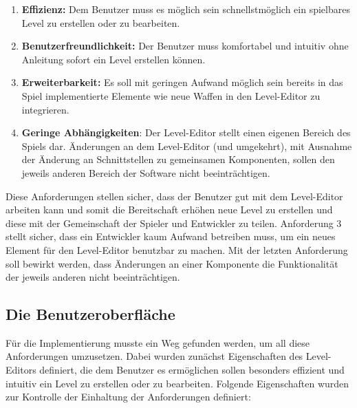 \begin{enumerate}
	\item \textbf{Effizienz:} Dem Benutzer muss es möglich sein schnellstmöglich ein spielbares Level zu erstellen oder zu bearbeiten.
	\item \textbf{Benutzerfreundlichkeit:} Der Benutzer muss  komfortabel und intuitiv ohne Anleitung sofort ein Level erstellen können.
	\item \textbf{Erweiterbarkeit:} Es soll mit geringen Aufwand möglich sein bereits in das Spiel implementierte Elemente wie neue Waffen in den Level-Editor zu integrieren.
	\item \textbf{Geringe Abhängigkeiten}: Der Level-Editor stellt einen eigenen Bereich des Spiels dar. Änderungen an dem Level-Editor (und umgekehrt), mit Ausnahme der Änderung an Schnittstellen zu gemeinsamen Komponenten, sollen den jeweils anderen Bereich der Software nicht beeinträchtigen.
\end{enumerate}

Diese Anforderungen stellen sicher, dass der Benutzer gut mit dem Level-Editor arbeiten kann und somit die Bereitschaft erhöhen neue Level zu erstellen und diese mit der Gemeinschaft der Spieler und Entwickler zu teilen. Anforderung 3 stellt sicher, dass ein Entwickler kaum Aufwand betreiben muss, um ein neues Element für den Level-Editor benutzbar zu machen. Mit der letzten Anforderung soll bewirkt werden, dass Änderungen an einer Komponente die Funktionalität der jeweils anderen nicht beeinträchtigen.

\subsection{Die Benutzeroberfläche}\label{sec:user_interface}
Für die Implementierung musste ein Weg gefunden werden, um all diese Anforderungen umzusetzen. Dabei wurden zunächst Eigenschaften des Level-Editors definiert, die dem Benutzer es ermöglichen sollen besonders effizient und intuitiv ein Level zu erstellen oder zu bearbeiten. Folgende Eigenschaften wurden zur Kontrolle der Einhaltung der Anforderungen definiert:

